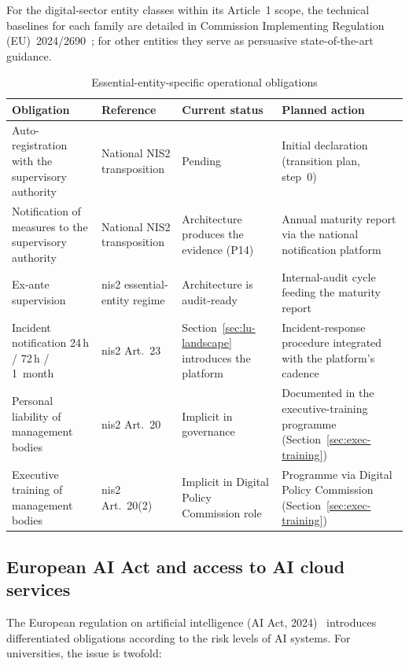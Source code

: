 \noindent For the digital-sector entity classes within its
Article~1 scope, the technical baselines for each family are
detailed in Commission Implementing Regulation
(EU)~2024/2690~\cite{eu-regulation-2024-2690}; for other entities
they serve as persuasive state-of-the-art guidance.

\begin{table}[H]
\centering
\caption{Essential-entity-specific operational obligations}
\label{tab:obligations-essentielles}
\small
\begin{tabularx}{\textwidth}{X l X X}
\toprule
\textbf{Obligation} & \textbf{Reference} &
    \textbf{Current status} & \textbf{Planned action} \\
\midrule
Auto-registration with the supervisory authority &
    National NIS2 transposition &
    Pending & Initial declaration (transition plan, step~0) \\
\addlinespace
Notification of measures to the supervisory authority &
    National NIS2 transposition &
    Architecture produces the evidence (P14) & Annual maturity
    report via the national notification platform \\
\addlinespace
Ex-ante supervision & \gls{nis2} essential-entity regime &
    Architecture is audit-ready & Internal-audit cycle feeding
    the maturity report \\
\addlinespace
Incident notification 24\,h / 72\,h / 1~month &
    \gls{nis2} Art.~23 &
    Section~\ref{sec:lu-landscape} introduces the platform &
    Incident-response procedure integrated with the platform's cadence \\
\addlinespace
Personal liability of management bodies &
    \gls{nis2} Art.~20 & Implicit in governance & Documented in
    the executive-training programme
    (Section~\ref{sec:exec-training}) \\
\addlinespace
Executive training of management bodies &
    \gls{nis2} Art.~20(2) & Implicit in Digital Policy Commission
    role & Programme via Digital Policy Commission
    (Section~\ref{sec:exec-training}) \\
\bottomrule
\end{tabularx}
\end{table}

\subsection{European AI Act and access to AI cloud services}

The European regulation on artificial intelligence (AI
Act, 2024)~\cite{eu-ai-act} introduces differentiated obligations
according to the risk levels of AI systems. For universities, the issue
is twofold:

